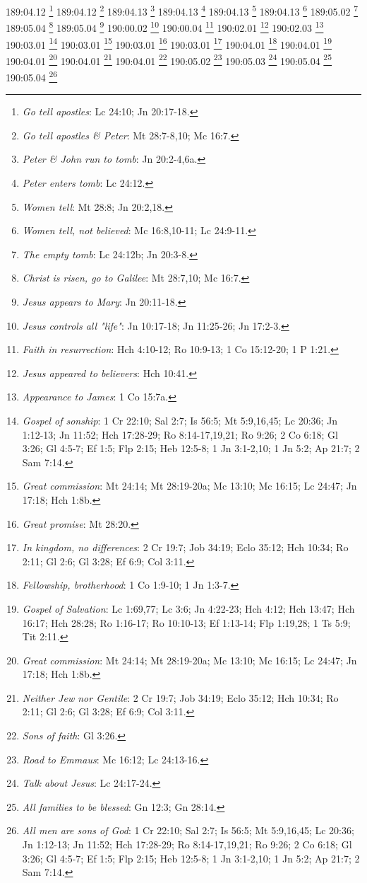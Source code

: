 189:04.12 \footnote{\textit{Go tell apostles}: Lc 24:10; Jn 20:17-18.}
189:04.12 \footnote{\textit{Go tell apostles & Peter}: Mt 28:7-8,10; Mc 16:7.}
189:04.13 \footnote{\textit{Peter & John run to tomb}: Jn 20:2-4,6a.}
189:04.13 \footnote{\textit{Peter enters tomb}: Lc 24:12.}
189:04.13 \footnote{\textit{Women tell}: Mt 28:8; Jn 20:2,18.}
189:04.13 \footnote{\textit{Women tell, not believed}: Mc 16:8,10-11; Lc 24:9-11.}
189:05.02 \footnote{\textit{The empty tomb}: Lc 24:12b; Jn 20:3-8.}
189:05.04 \footnote{\textit{Christ is risen, go to Galilee}: Mt 28:7,10; Mc 16:7.}
189:05.04 \footnote{\textit{Jesus appears to Mary}: Jn 20:11-18.}
190:00.02 \footnote{\textit{Jesus controls all "life"}: Jn 10:17-18; Jn 11:25-26; Jn 17:2-3.}
190:00.04 \footnote{\textit{Faith in resurrection}: Hch 4:10-12; Ro 10:9-13; 1 Co 15:12-20; 1 P 1:21.}
190:02.01 \footnote{\textit{Jesus appeared to believers}: Hch 10:41.}
190:02.03 \footnote{\textit{Appearance to James}: 1 Co 15:7a.}
190:03.01 \footnote{\textit{Gospel of sonship}: 1 Cr 22:10; Sal 2:7; Is 56:5; Mt 5:9,16,45; Lc 20:36; Jn 1:12-13; Jn 11:52; Hch 17:28-29; Ro 8:14-17,19,21; Ro 9:26; 2 Co 6:18; Gl 3:26; Gl 4:5-7; Ef 1:5; Flp 2:15; Heb 12:5-8; 1 Jn 3:1-2,10; 1 Jn 5:2; Ap 21:7; 2 Sam 7:14.}
190:03.01 \footnote{\textit{Great commission}: Mt 24:14; Mt 28:19-20a; Mc 13:10; Mc 16:15; Lc 24:47; Jn 17:18; Hch 1:8b.}
190:03.01 \footnote{\textit{Great promise}: Mt 28:20.}
190:03.01 \footnote{\textit{In kingdom, no differences}: 2 Cr 19:7; Job 34:19; Eclo 35:12; Hch 10:34; Ro 2:11; Gl 2:6; Gl 3:28; Ef 6:9; Col 3:11.}
190:04.01 \footnote{\textit{Fellowship, brotherhood}: 1 Co 1:9-10; 1 Jn 1:3-7.}
190:04.01 \footnote{\textit{Gospel of Salvation}: Lc 1:69,77; Lc 3:6; Jn 4:22-23; Hch 4:12; Hch 13:47; Hch 16:17; Hch 28:28; Ro 1:16-17; Ro 10:10-13; Ef 1:13-14; Flp 1:19,28; 1 Ts 5:9; Tit 2:11.}
190:04.01 \footnote{\textit{Great commission}: Mt 24:14; Mt 28:19-20a; Mc 13:10; Mc 16:15; Lc 24:47; Jn 17:18; Hch 1:8b.}
190:04.01 \footnote{\textit{Neither Jew nor Gentile}: 2 Cr 19:7; Job 34:19; Eclo 35:12; Hch 10:34; Ro 2:11; Gl 2:6; Gl 3:28; Ef 6:9; Col 3:11.}
190:04.01 \footnote{\textit{Sons of faith}: Gl 3:26.}
190:05.02 \footnote{\textit{Road to Emmaus}: Mc 16:12; Lc 24:13-16.}
190:05.03 \footnote{\textit{Talk about Jesus}: Lc 24:17-24.}
190:05.04 \footnote{\textit{All families to be blessed}: Gn 12:3; Gn 28:14.}
190:05.04 \footnote{\textit{All men are sons of God}: 1 Cr 22:10; Sal 2:7; Is 56:5; Mt 5:9,16,45; Lc 20:36; Jn 1:12-13; Jn 11:52; Hch 17:28-29; Ro 8:14-17,19,21; Ro 9:26; 2 Co 6:18; Gl 3:26; Gl 4:5-7; Ef 1:5; Flp 2:15; Heb 12:5-8; 1 Jn 3:1-2,10; 1 Jn 5:2; Ap 21:7; 2 Sam 7:14.}
